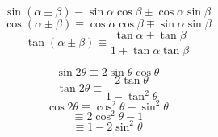 \documentclass[../main.tex]{subfile}
\begin{document}
\vspace{2.5em}

\begin{figure}[h]
\centering
\large
\begin{minipage}{0.49\linewidth}
	$$\sin(\alpha \pm \beta) \equiv \sin\alpha\cos\beta \pm \cos\alpha\sin\beta$$
	\vspace{0.5em}
	$$\cos(\alpha \pm \beta) \equiv \cos\alpha\cos\beta \mp \sin\alpha\sin\beta$$
	\vspace{0.5em}
	$$\tan(\alpha \pm \beta) \equiv \frac{\tan\alpha \pm \tan\beta}{1 \mp \tan\alpha\tan\beta}$$
\end{minipage}\hfill
\begin{minipage}{0.49\linewidth}
	$$\sin 2\theta \equiv 2\sin\theta\cos\theta$$
	\vspace{0.5em}
	$$\tan 2\theta \equiv \frac{2\tan\theta}{1 - \tan^2\theta}$$
	\vspace{0.5em}
	$$\cos 2\theta \equiv \cos^2\theta - \sin^2\theta$$
	$$\equiv 2\cos^2\theta - 1$$
	$$\equiv 1 - 2\sin^2\theta$$
\end{minipage}
\normalsize
\end{figure}
\end{document}
